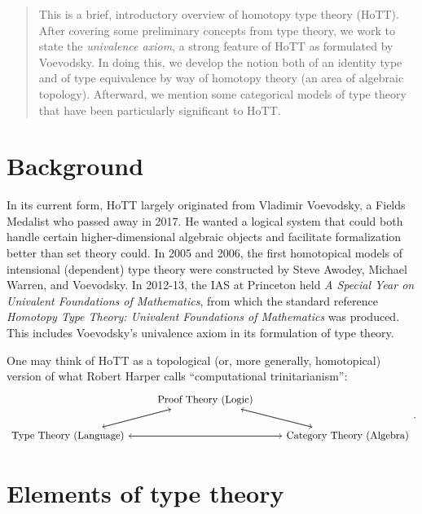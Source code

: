 \documentclass[10pt,letterpaper,cm]{nupset}
\theoremstyle{definition}
\theoremstyle{theorem}
\theoremstyle{remark}
\newcommand{\1}{\mathbf{1}}
\newcommand{\0}{\vec 0}
\begin{document}
\begin{abstract}
This is a brief, introductory overview of homotopy type theory (HoTT). After covering some preliminary concepts from type theory, we work to state the \textit{univalence axiom}, a strong feature of HoTT as formulated by Voevodsky. In doing this, we develop the notion both of an identity type and of type equivalence by way of homotopy theory (an area of algebraic topology). Afterward, we mention some categorical models of type theory that have been particularly significant to HoTT.
\end{abstract}



\tableofcontents
\newpage


\section*{Background}

In its current form, HoTT largely originated from Vladimir Voevodsky, a Fields Medalist who passed away in 2017. He wanted a logical system that could both handle certain higher-dimensional algebraic objects and facilitate formalization better than set theory could. In 2005 and 2006, the first homotopical models of intensional (dependent) type theory were constructed by Steve Awodey, Michael Warren, and Voevodsky. In 2012-13,  the IAS at Princeton held \textit{A Special Year on Univalent Foundations of Mathematics}, from which the standard reference \textit{Homotopy Type Theory: Univalent Foundations of Mathematics} was produced. This includes Voevodsky's univalence axiom in its formulation of type theory.

One may think of HoTT as a topological (or, more generally, homotopical) version of what Robert Harper calls ``computational trinitarianism'':
\[
\begin{tikzcd}
 & \text{Proof Theory (Logic)} \arrow[rd] \arrow[ld] &  \\
\text{Type Theory (Language)} \arrow[ru] \arrow[rr] &  & \text{Category Theory (Algebra)} \arrow[lu] \arrow[ll]
\end{tikzcd}
.\]

\section{Elements of type theory}
\end{document}
